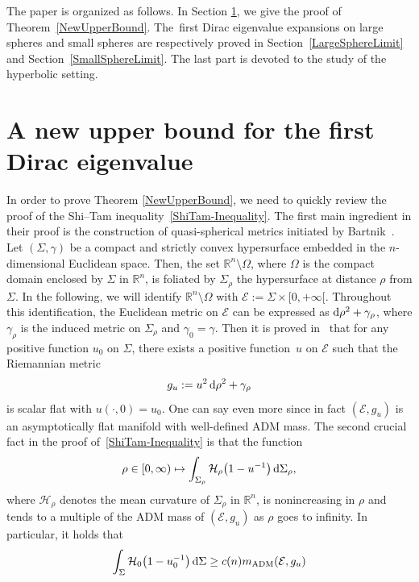 \documentclass[10pt,a4paper]{amsart}
\numberwithin{equation}{section}
\begin{document}
The paper is organized as follows. In Section \ref{UpperBoundDiracEuclidean}, we give the proof of Theorem~\ref{NewUpperBound}. The~first Dirac eigenvalue expansions on large spheres and small spheres are respectively proved in Section~\ref{LargeSphereLimit} and Section~\ref{SmallSphereLimit}. The last part is devoted to the study of the hyperbolic setting.
\section{A new upper bound for the first Dirac eigenvalue}\label{UpperBoundDiracEuclidean}

In order to prove Theorem \ref{NewUpperBound}, we need to quickly review the proof of the Shi--Tam inequality~\eqref{ShiTam-Inequality}. The first main ingredient in their proof is the construction of quasi-spherical metrics initiated by Bartnik~\cite{Bartnik4}. Let $(\Sigma,\gamma)$ be a compact and strictly convex hypersurface embedded in the $n$-dimensional Euclidean space. Then, the set $\mathbb{R}^n\setminus\Omega$, where $\Omega$ is the compact domain enclosed by $\Sigma$ in $\mathbb{R}^n$, is foliated by $\Sigma_{\rho}$ the hypersurface at distance $\rho$ from $\Sigma$. In the following, we will identify $\mathbb{R}^n\setminus\Omega$ with $\mathcal{E}:=\Sigma\times[0,+\infty[$. Throughout this identification, the Euclidean metric on $\mathcal{E}$ can be expressed as ${\rm d}\rho^2+\gamma_\rho$, where $\gamma_\rho$ is the induced metric on $\Sigma_\rho$ and $\gamma_0=\gamma$. Then it is proved in~\cite{ShiTam1} that for any positive function $u_0$ on $\Sigma$, there exists a positive function~$u$ on $\mathcal{E}$ such that the Riemannian metric
\begin{gather}\label{QS-metric}
g_u:=u^2\,{\rm d}\rho^2+\gamma_\rho
\end{gather}
is scalar flat with $u(\cdot,0)=u_0$. One can say even more since in fact $(\mathcal{E},g_u)$ is an asymptotically flat manifold with well-defined ADM mass. The second crucial fact in the proof of~\eqref{ShiTam-Inequality} is that the function
\begin{gather*}
\rho\in[0,\infty)\mapsto\int_{\Sigma_\rho}\mathcal{H}_\rho\big(1-u^{-1}\big)\,{\rm d}\Sigma_\rho,
\end{gather*}
where $\mathcal{H}_\rho$ denotes the mean curvature of $\Sigma_\rho$ in $\mathbb{R}^n$, is nonincreasing in $\rho$ and tends to a multiple of the ADM mass of $(\mathcal{E},g_u)$ as $\rho$ goes to infinity. In particular, it holds that
\begin{gather*}%
\int_{\Sigma}\mathcal{H}_0\big(1-u^{-1}_0\big)\,{\rm d}\Sigma\geq c(n)m_{\rm ADM}(\mathcal{E},g_u)
\end{gather*}
\end{document}
